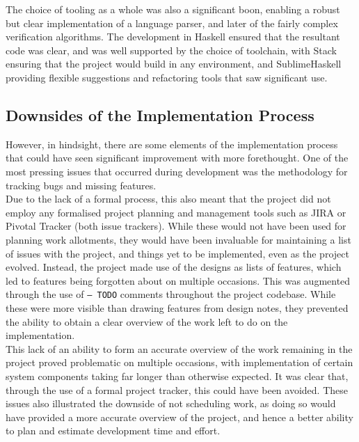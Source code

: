 The choice of tooling as a whole was also a significant boon, enabling a robust but clear implementation of a language parser, and later of the fairly complex verification algorithms.
The development in Haskell ensured that the resultant code was clear, and was well supported by the choice of toolchain, with Stack ensuring that the project would build in any environment, and SublimeHaskell providing flexible suggestions and refactoring tools that saw significant use. 


\subsection{Downsides of the Implementation Process} %
\label{sub:downsides_of_the_implementation_process}
However, in hindsight, there are some elements of the implementation process that could have seen significant improvement with more forethought. 
One of the most pressing issues that occurred during development was the methodology for tracking bugs and missing features. \\

Due to the lack of a formal process, this also meant that the project did not employ any formalised project planning and management tools such as JIRA or Pivotal Tracker (both issue trackers).
While these would not have been used for planning work allotments, they would have been invaluable for maintaining a list of issues with the project, and things yet to be implemented, even as the project evolved.
Instead, the project made use of the designs as lists of features, which led to features being forgotten about on multiple occasions.
This was augmented through the use of \texttt{-- TODO} comments throughout the project codebase.
While these were more visible than drawing features from design notes, they prevented the ability to obtain a clear overview of the work left to do on the implementation.\\

This lack of an ability to form an accurate overview of the work remaining in the project proved problematic on multiple occasions, with implementation of certain system components taking far longer than otherwise expected.
It was clear that, through the use of a formal project tracker, this could have been avoided.
These issues also illustrated the downside of not scheduling work, as doing so would have provided a more accurate overview of the project, and hence a better ability to plan and estimate development time and effort. 

